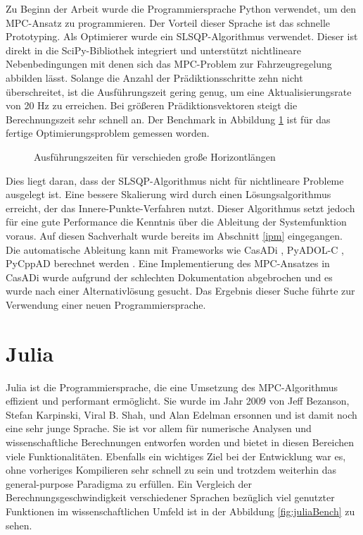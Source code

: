 \documentclass{like}
\begin{document}
Zu Beginn der Arbeit wurde die Programmiersprache Python verwendet, um den \ac{MPC}-Ansatz zu programmieren. Der Vorteil dieser Sprache ist das schnelle Prototyping. Als Optimierer wurde ein \ac{SLSQP}-Algorithmus verwendet. Dieser ist direkt in die SciPy-Bibliothek \cite{Scipy} integriert und unterstützt nichtlineare Nebenbedingungen mit denen sich das \ac{MPC}-Problem zur Fahrzeugregelung abbilden lässt. Solange die Anzahl der Prädiktionsschritte zehn nicht überschreitet, ist die Ausführungszeit gering genug, um eine Aktualisierungsrate von 20 Hz zu erreichen. Bei größeren Prädiktionsvektoren steigt die Berechnungszeit sehr schnell an. Der Benchmark in Abbildung \ref{fig:pythonBench} ist für das fertige Optimierungsproblem gemessen worden.
\begin{figure}[ht!]
	\centering
	 
	\caption{Ausführungszeiten für verschieden  große Horizontlängen}
	\label{fig:pythonBench}
\end{figure}
Dies liegt daran, dass der \ac{SLSQP}-Algorithmus nicht für nichtlineare Probleme ausgelegt ist. Eine bessere Skalierung wird durch einen Lösungsalgorithmus erreicht, der das Innere-Punkte-Verfahren nutzt. Dieser Algorithmus setzt jedoch für eine gute Performance die Kenntnis über die Ableitung der Systemfunktion voraus. Auf diesen Sachverhalt wurde bereits im Abschnitt \ref{ipm} eingegangen. Die automatische Ableitung kann mit Frameworks wie CasADi \cite{CasADi}, PyADOL-C \cite{PYADOLC}, PyCppAD \cite{CppAD} berechnet werden \cite{DBLP:journals/corr/TurkinT16}. 
Eine Implementierung des \ac{MPC}-Ansatzes in CasADi wurde  aufgrund der schlechten Dokumentation abgebrochen und es wurde nach einer Alternativlösung gesucht. Das Ergebnis dieser Suche führte zur Verwendung einer neuen Programmiersprache. 


\section{Julia}
\label{julia}
Julia ist die Programmiersprache, die eine Umsetzung des \ac{MPC}-Algorithmus effizient und performant ermöglicht. Sie wurde im Jahr 2009 von Jeff Bezanson, Stefan Karpinski, Viral B. Shah, und Alan Edelman ersonnen und ist damit noch eine sehr junge Sprache. Sie ist vor allem für numerische Analysen und wissenschaftliche Berechnungen entworfen worden und bietet in diesen Bereichen viele Funktionalitäten. Ebenfalls ein wichtiges Ziel bei der Entwicklung war es, ohne vorheriges Kompilieren sehr schnell zu sein und trotzdem weiterhin das general-purpose Paradigma zu erfüllen. Ein Vergleich der Berechnungsgeschwindigkeit verschiedener Sprachen bezüglich viel genutzter Funktionen im wissenschaftlichen Umfeld ist in der Abbildung \ref{fig:juliaBench} zu sehen.
\end{document}

